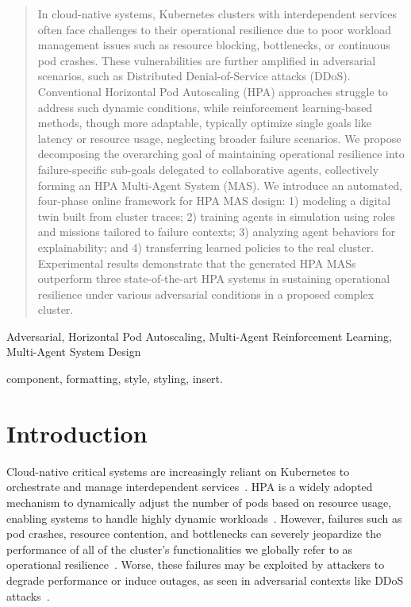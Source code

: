 \documentclass[conference]{IEEEtran}
\begin{document}
\maketitle

\begin{abstract}
    In cloud-native systems, Kubernetes clusters with interdependent services often face challenges to their operational resilience due to poor workload management issues such as resource blocking, bottlenecks, or continuous pod crashes. These vulnerabilities are further amplified in adversarial scenarios, such as Distributed Denial-of-Service attacks (DDoS). Conventional Horizontal Pod Autoscaling (HPA) approaches struggle to address such dynamic conditions, while reinforcement learning-based methods, though more adaptable, typically optimize single goals like latency or resource usage, neglecting broader failure scenarios.
    We propose decomposing the overarching goal of maintaining operational resilience into failure-specific sub-goals delegated to collaborative agents, collectively forming an HPA Multi-Agent System (MAS). We introduce an automated, four-phase online framework for HPA MAS design: 1) modeling a digital twin built from cluster traces; 2) training agents in simulation using roles and missions tailored to failure contexts; 3) analyzing agent behaviors for explainability; and 4) transferring learned policies to the real cluster.
    Experimental results demonstrate that the generated HPA MASs outperform three state-of-the-art HPA systems in sustaining operational resilience under various adversarial conditions in a proposed complex cluster.
\end{abstract}

\begin{IEEEkeywords}
    Adversarial, Horizontal Pod Autoscaling, Multi-Agent Reinforcement Learning, Multi-Agent System Design
\end{IEEEkeywords}
component, formatting, style, styling, insert.

\section{Introduction}
\label{sec:introduction}

Cloud-native critical systems are increasingly reliant on Kubernetes to orchestrate and manage interdependent services~\cite{Pahl2019}. HPA is a widely adopted mechanism to dynamically adjust the number of pods based on resource usage, enabling systems to handle highly dynamic workloads~\cite{Toka2020}. However, failures such as pod crashes, resource contention, and bottlenecks can severely jeopardize the performance of all of the cluster's functionalities we globally refer to as operational resilience~\cite{burns2016borg}. Worse, these failures may be exploited by attackers to degrade performance or induce outages, as seen in adversarial contexts like DDoS attacks~\cite{David2021}.
\end{document}
